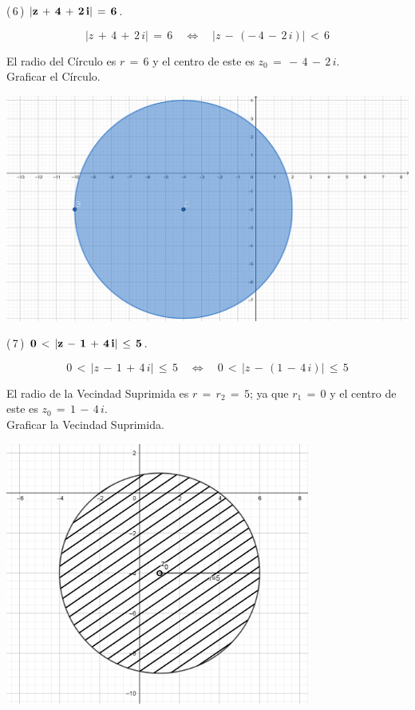 \documentclass[a4paper,11pt,openany]{book}
\begin{document}
\newpage

\textcolor{ao(english)}{(\,6\,)} $\bf{|z\,+\,4\,+\,2\,i|\,=\,6}$.

$$|z\,+\,4\,+\,2\,i|\,=\,6 \quad\iff\quad |z\,-\,(-\,4\,-\,2\,i)|\,<\,6$$

El radio del Círculo es $r\,=\,6$ y el centro de este es $z_{0}\,=\,-\,4\,-\,2\,i$.\\

\textcolor{ao(english)}{} Graficar el Círculo.

\begin{center}
     \includegraphics[width=15cm]{Gra-Ej-6.png}
\end{center}

\textcolor{ao(english)}{(\,7\,)} $\bf{0\,<\,|z\,-\,1\,+\,4\,i|\,\leq\,5}$.

$$0\,<\,|z\,-\,1\,+\,4\,i|\,\leq\,5 \quad\iff\quad 0\,<\,|z\,-\,(1\,-\,4\,i)|\,\leq\,5$$

El radio de la Vecindad Suprimida es $r\,=\,r_{2}\,=\,5$; ya que $r_{1}\,=\,0$ y el centro de este es $z_{0}\,=\,1\,-\,4\,i$.\\

\textcolor{ao(english)}{} Graficar la Vecindad Suprimida.

\begin{center}
    \includegraphics[width=10cm]{Gra-Ej-7.png}
\end{center}
\end{document}
